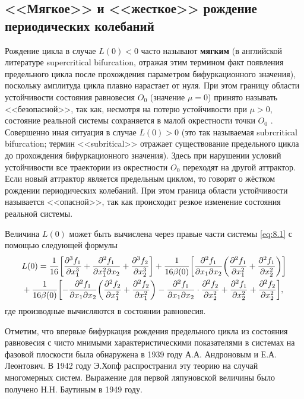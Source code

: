 \subsection{<<Мягкое>> и <<жесткое>> рождение периодических колебаний}%
\label{sub:8.3.3}

Рождение цикла в случае $L(0)<0$ часто называют \textbf{мягким} (в английской
литературе supercritical bifurcation, отражая этим термином факт появления
предельного цикла после прохождения параметром бифуркационного
значения), поскольку амплитуда цикла плавно нарастает от нуля. При этом
границу области устойчивости состояния равновесия $O_0$ (значение $\mu=0$)
принято называть <<безопасной>>, так как, несмотря на потерю устойчивости при
$\mu>0$, состояние реальной системы сохраняется в малой окрестности точки $O_0$ .
Совершенно иная ситуация в случае $L(0)>0$ (это так называемая subrcritical
bifurcation; термин <<subritical>> отражает существование предельного цикла до
прохождения бифуркационного значения). Здесь при нарушении условий
устойчивости все траектории из окрестности $O_0$ переходят на другой аттрактор.
Если новый аттрактор является предельным циклом, то говорят о жёстком
рождении периодических колебаний. При этом граница области устойчивости
называется <<опасной>>, так как происходит резкое изменение состояния
реальной системы.

Величина $L(0)$ может быть вычислена через правые части системы \eqref{eq:8.1} с помощью
следующей формулы
\begin{align}
        \label{eq:8.12}
       & L(0) = \frac{1}{16} \qty[ \pdv[3]{f_1}{x_1} + \pdv[3]{f_1}{x_1^2}{x_2} +
        \pdv[3]{f_2}{x_2}]
        + \frac{1}{16 \beta(0)}
        \qty[
        \pdv{f_1}{x_1}{x_2}
        \qty( \pdv[2]{f_1}{x_1} + \pdv[2]{f_1}{x_2})] \\
       & + \frac{1}{16 \beta(0)} 
        \qty[- 
        \pdv{f_1}{x_1}{x_2} \qty( \pdv[2]{f_2}{x_1} + \pdv[2]{f_2}{x_1}) -
        \pdv{f_1}{x_1}{x_2} \cdot \pdv[2]{f_2}{x_2} +
        \pdv[2]{f_1}{x_2} +
        \pdv[2]{f_2}{x_2} 
        ],
\end{align}
где производные вычисляются в состоянии равновесия.

Отметим, что впервые бифуркация рождения предельного цикла из
состояния равновесия с чисто мнимыми характеристическими показателями в
системах на фазовой плоскости была обнаружена в 1939 году А.А. Андроновым
и Е.А. Леонтович. В 1942 году Э.Хопф распространил эту теорию на случай
многомерных систем. Выражение для первой ляпуновской величины было
получено Н.Н. Баутиным в 1949 году.


